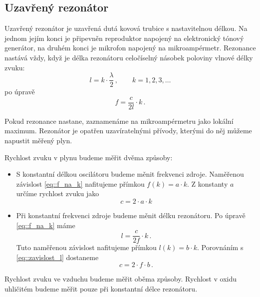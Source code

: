 \subsection*{Uzavřený rezonátor}
Uzavřený rezonátor je uzavřená dutá kovová trubice s nastavitelnou délkou.
Na jednom jejím konci je připevněn reproduktor napojený na elektronický tónový generátor, na druhém konci je mikrofon napojený na mikroampérmetr.
Rezonance nastává vždy, když je délka rezonátoru celočíselný násobek poloviny vlnové délky zvuku:
\begin{equation} \label{eq::l_na_k}
l=k \cdot \frac{\lambda}{2} \,,  \qquad  k=1, 2, 3, \ldots
\end{equation}
po úpravě
\begin{equation} \label{eq::f_na_k}
f=\frac{c}{2l} \cdot k \,.
\end{equation}

Pokud rezonance nastane, zaznamenáme na mikroampérmetru jako lokální maximum.
Rezonátor je opatřen uzavíratelnými přívody, kterými do něj můžeme napustit měřený plyn.

Rychlost zvuku v plynu budeme měřit dvěma způsoby:
\begin{itemize}
\item S konstantní délkou oscilátoru budeme měnit frekvenci zdroje. Naměřenou závislost \eqref{eq::f_na_k} nafitujeme přímkou $f(k) = a \cdot k$. Z konstanty $a$ určíme rychlost zvuku jako
\begin{equation}
c = 2 \cdot a \cdot k
\end{equation}
\item Při konstantní frekvenci zdroje budeme měnit délku rezonátoru. Po úpravě \eqref{eq::f_na_k} máme
\begin{equation} \label{eq::zavislost_l}
l= \frac{c}{2f} \cdot k  \,.
\end{equation}
Tuto naměřenou závislost nafitujeme přímkou $l(k)= b \cdot k$. Porovnáním s \eqref{eq::zavislost_l} dostaneme
\begin{equation}
c = 2 \cdot f \cdot b \,.
\end{equation}
\end{itemize}

Rychlost zvuku ve vzduchu budeme měřit oběma způsoby.
Rychlost v oxidu uhličitém budeme měřit pouze při konstantní délce rezonátoru.